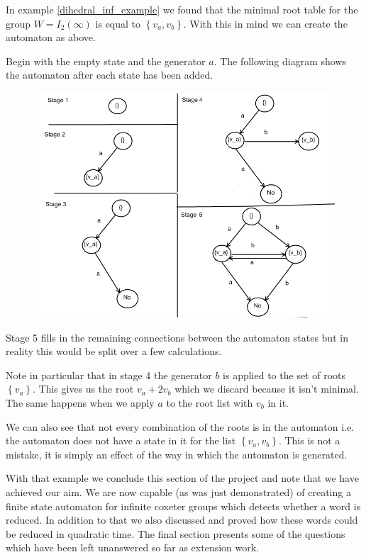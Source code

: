 \documentclass[a4paper,12pt]{article}
\begin{document}
\begin{example}
	In example \ref{dihedral_inf_example} we found that the minimal root table for the group $W = I_2(\infty)$ is equal to $\left\{v_a, v_b \right\}$. With this in mind we can create the automaton as above.
	
	Begin with the empty state and the generator $a$. The following diagram shows the automaton after each state has been added.
	
	\begin{figure}[H]
		\includegraphics[width=\columnwidth]{inf_dihed_automaton}
	\end{figure}
	
	Stage 5 fills in the remaining connections between the automaton states but in reality this would be split over a few calculations.
	
	Note in particular that in stage 4 the generator $b$ is applied to the set of roots $\left\{v_a\right\}$. This gives us the root $v_a + 2v_b$ which we discard because it isn't minimal. The same happens when we apply $a$ to the root list with $v_b$ in it.
	
	We can also see that not every combination of the roots is in the automaton i.e. the automaton does not have a state in it for the list $\left\{v_a, v_b\right\}$. This is not a mistake, it is simply an effect of the way in which the automaton is generated.
\end{example}

	With that example we conclude this section of the project and note that we have achieved our aim. We are now capable (as was just demonstrated) of creating a finite state automaton for infinite coxeter groups which detects whether a word is reduced. In addition to that we also discussed and proved how these words could be reduced in quadratic time. The final section presents some of the questions which have been left unanswered so far as extension work.
\end{document}
